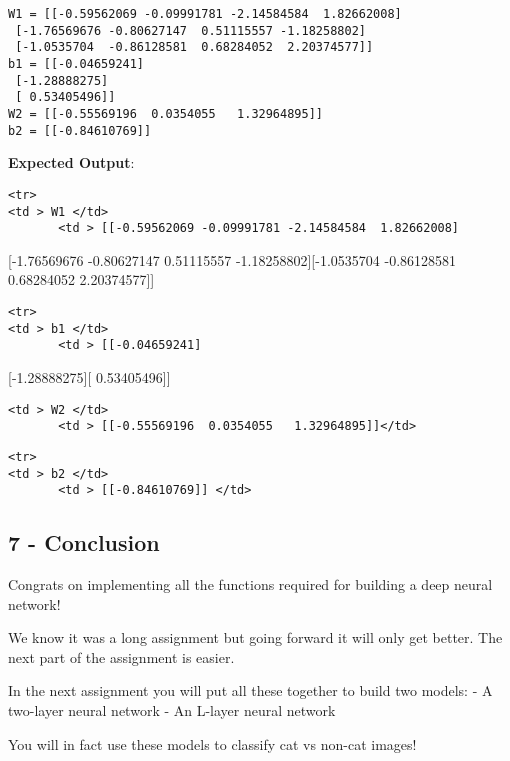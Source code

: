 \documentclass[11pt]{article}
\begin{document}
    \begin{Verbatim}[commandchars=\\\{\}]
W1 = [[-0.59562069 -0.09991781 -2.14584584  1.82662008]
 [-1.76569676 -0.80627147  0.51115557 -1.18258802]
 [-1.0535704  -0.86128581  0.68284052  2.20374577]]
b1 = [[-0.04659241]
 [-1.28888275]
 [ 0.53405496]]
W2 = [[-0.55569196  0.0354055   1.32964895]]
b2 = [[-0.84610769]]

    \end{Verbatim}

    \textbf{Expected Output}:

\begin{verbatim}
<tr>
<td > W1 </td> 
       <td > [[-0.59562069 -0.09991781 -2.14584584  1.82662008]
\end{verbatim}

{[}-1.76569676 -0.80627147 0.51115557 -1.18258802{]}{[}-1.0535704
-0.86128581 0.68284052 2.20374577{]}{]}

\begin{verbatim}
<tr>
<td > b1 </td> 
       <td > [[-0.04659241]
\end{verbatim}

{[}-1.28888275{]}{[} 0.53405496{]}{]}

\begin{verbatim}
<td > W2 </td> 
       <td > [[-0.55569196  0.0354055   1.32964895]]</td> 
\end{verbatim}

\begin{verbatim}
<tr>
<td > b2 </td> 
       <td > [[-0.84610769]] </td> 
\end{verbatim}

    \subsection{7 - Conclusion}\label{conclusion}

Congrats on implementing all the functions required for building a deep
neural network!

We know it was a long assignment but going forward it will only get
better. The next part of the assignment is easier.

In the next assignment you will put all these together to build two
models: - A two-layer neural network - An L-layer neural network

You will in fact use these models to classify cat vs non-cat images!


    
    
    
    
\end{document}
